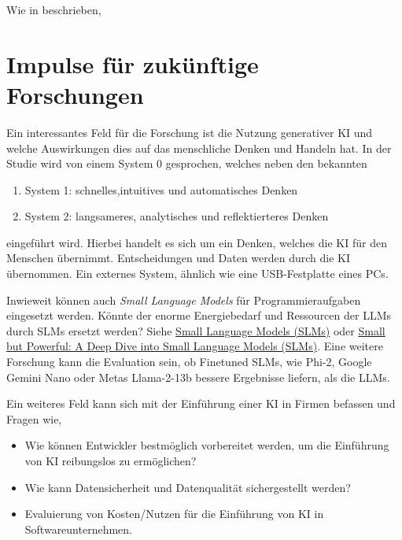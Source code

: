 Wie in \cite{hartenstein_2024} beschrieben,

\section{Impulse für zukünftige Forschungen}
Ein interessantes Feld für die Forschung ist die Nutzung generativer KI und welche Auswirkungen dies auf das menschliche Denken und Handeln hat. In der Studie \cite{chiriatti-2024} wird von einem System 0 gesprochen, welches neben den bekannten 
\begin{enumerate}
	\item System 1: schnelles,intuitives und automatisches Denken
	\item System 2: langsameres, analytisches und reflektierteres Denken
\end{enumerate}

eingeführt wird. Hierbei handelt es sich um ein Denken, welches die KI für den Menschen übernimmt. Entscheidungen und Daten werden durch die KI übernommen. Ein externes System, ähnlich wie eine USB-Festplatte eines PCs.\vspace{0.2cm}

Inwieweit können auch \textit{Small Language Models} für Programmieraufgaben eingesetzt werden. Könnte der enorme Energiebedarf und Ressourcen der LLMs durch SLMs ersetzt werden? Siehe 
\href{https://medium.com/@nageshmashette32/small-language-models-slms-305597c9edf2}{Small Language Models (SLMs)} oder \href{https://medium.com/version-1/small-but-powerful-a-deep-dive-into-small-language-models-slms-b793bdb002f2}{Small but Powerful: A Deep Dive into Small Language Models (SLMs)}. Eine weitere Forschung kann die Evaluation sein, ob Finetuned SLMs, wie Phi-2, Google Gemini Nano oder Metas Llama-2-13b bessere Ergebnisse liefern, als die LLMs.\vspace{0.2cm}

Ein weiteres Feld kann sich mit der Einführung einer KI in Firmen befassen und Fragen wie,

\begin{itemize}
	\item Wie können Entwickler bestmöglich vorbereitet werden, um die Einführung von KI reibungslos zu ermöglichen?
	\item Wie kann Datensicherheit und Datenqualität sichergestellt werden?
	\item Evaluierung von Kosten/Nutzen für die Einführung von KI in Softwareunternehmen.
\end{itemize}


